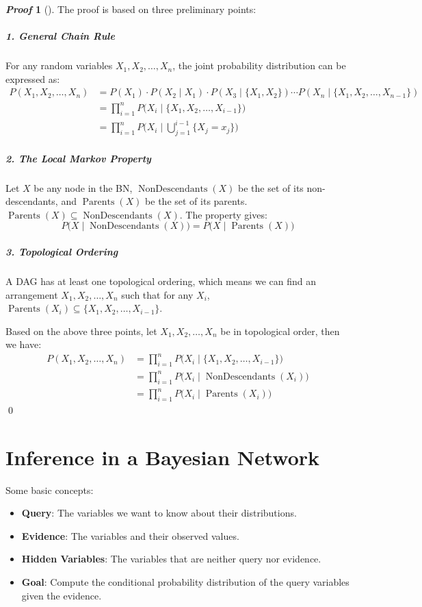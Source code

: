 \documentclass[10pt,UTF8]{article}
\theoremstyle{definition}
\newtheorem{definition inner}{Definition}[section]
\theoremstyle{definition}
\newtheorem{theorem inner}{Theorem}[section]
\theoremstyle{definition}
\newtheorem*{proof inner}{\textit{Proof}}
\renewenvironment{proof}[1][]
{
\begin{proof inner}[#1]\hfill\par}
  {\qed{}
\end{proof inner}}
\theoremstyle{plain}
\newtheorem{tip inner}{Tip}[section]
\theoremstyle{remark}
\DeclareMathOperator{\Pa}{Parents} %
\DeclareMathOperator{\Nd}{NonDescendants} %
\begin{document}
\begin{proof}
  The proof is based on three preliminary points:
  \subparagraph*{1. General Chain Rule}
  For any random variables
  \( X_1, X_2, \ldots, X_n \),
  the joint probability distribution can be expressed as:
  \begin{align*}
    P(X_1, X_2, \ldots, X_n)
    & = P(X_1) \cdot
    P(X_2 \mid X_1) \cdot
    P(X_3 \mid \big \{ X_1, X_2 \big \} ) \cdots
    P(X_n \mid \big \{ X_1, X_2, \ldots, X_{n-1} \big \} ) \\
    & = \prod_{i=1}^{n} P\Big(X_i \mid
    \big \{ X_1, X_2, \ldots, X_{i-1} \big \} \Big)        \\
    & = \prod_{i=1}^{n} P\Big(X_i \mid
      \bigcup_{j=1}^{i-1}
    \big \{ X_j = x_j \big \}  \Big)
  \end{align*}
  \subparagraph*{2. The Local Markov Property}
  Let \(X\) be any node in the BN,
  \(\Nd(X)\) be the set of its non-descendants,
  and \(\Pa(X)\) be the set of its parents.
  \( \Pa(X) \subseteq \Nd(X) \).
  The property gives:
  \[
    P\big(X \mid \Nd(X)\big) =
    P\big(X \mid \Pa(X)\big)
  \]
  \subparagraph*{3. Topological Ordering}
  A DAG has at least one topological ordering,
  which means we can find an arrangement
  \(X_1, X_2, \ldots, X_n\) such that
  for any \(X_i\), \(\Pa(X_i) \subseteq \big \{ X_1, X_2, \ldots,
  X_{i-1} \big \} \).

  \bigskip
  Based on the above three points,
  let \(X_1,X_2,\ldots,X_n\) be in topological order,
  then we have:
  \begin{align*}
    P(X_1, X_2, \ldots, X_n)
    & = \prod_{i=1}^{n} P\Big(X_i \mid
    \big \{ X_1, X_2, \ldots, X_{i-1} \big \} \Big)   \\
    & = \prod_{i=1}^{n} P\Big(X_i \mid \Nd(X_i)\Big) \\
    & = \prod_{i=1}^{n} P\Big(X_i \mid \Pa(X_i)\Big)
  \end{align*}
\end{proof}

\section{Inference in a Bayesian Network}

\noindent
Some basic concepts:

\begin{itemize}
  \item \textbf{Query}: The variables we want to know about their distributions.
  \item \textbf{Evidence}: The variables and their observed values.
  \item \textbf{Hidden Variables}: The variables that are neither
    query nor evidence.
  \item \textbf{Goal}: Compute the conditional probability
    distribution of the query variables given the evidence.
\end{itemize}
\end{document}
